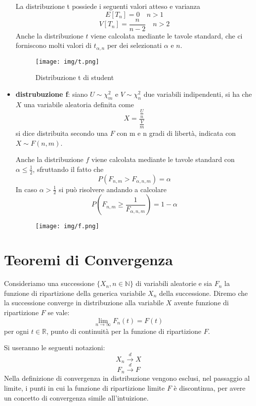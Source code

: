\documentclass[a4paper,12pt, oneside]{book}
\newcommand{\numberset}{\mathbb}
\newcommand{\N}{\numberset{N}}
\newcommand{\R}{\numberset{R}}
\begin{document}
\begin{itemize}
        La distribuzione t possiede i seguenti valori atteso e varianza
        \[ E[T_n] = 0 \quad n > 1 \]
        \[ V[T_n] = \frac{n}{n - 2} \quad n > 2 \]
        Anche la distribuzione $t$ viene calcolata mediante le tavole standard, che ci forniscono molti
        valori di $t_{\alpha, n}$ per dei selezionati $\alpha$ e $n$.
        \begin{figure}
            \caption{Distribuzione t di student}
            \label{img:student}
	        \texttt{[image: img/t.png]}
        \end{figure}

    \item \textbf{distrubuzione f}: siano $U \sim \chi_m^2$ e $V \sim \chi_n^2$ due variabili indipendenti, si
        ha che $X$ una variabile aleatoria definita come 
        \[X = \frac{\frac{U}{n}}{\frac{V}{m}}\]
        si dice distribuita secondo una $F$ con m e n gradi di libertà, indicata con $X \sim F(n, m)$.

        Anche la distribuzione $f$ viene calcolata mediante le tavole standard con $\alpha \leq \frac{1}{2}$,
        sfruttando il fatto che 
        \[ P(F_{n, m} > F_{\alpha, n, m}) = \alpha \]
        In caso $\alpha > \frac{1}{2}$ si può risolvere andando a calcolare
        \[ P(F_{n, m} \geq \frac{1}{F_{\alpha, n, m}}) = 1 - \alpha \]
        \begin{figure}
	        \texttt{[image: img/f.png]}
        \end{figure}
\end{itemize}

\chapter{Teoremi di Convergenza}
Consideriamo una successione $\{X_n, n \in \N\}$ di variabili aleatorie e sia $F_n$ la funzione di ripartizione
della generica variabile $X_n$ della successione.\newline
Diremo che la successione converge in distribuzione alla variabile $X$ avente funzione di ripartizione $F$ se vale:
\[\lim_{n\to\infty} F_n(t) = F(t)\]
per ogni $t \in \R$, punto di continuità per la funzione di ripartizione $F$. 

Si useranno le seguenti notazioni:
\[X_n\stackrel{d}{\longrightarrow} X\]
\[F_n\stackrel{d}{\longrightarrow} F\]
Nella definizione di convergenza in distribuzione vengono esclusi, nel passaggio al limite, i punti 
in cui la funzione di ripartizione limite $F$ è discontinua, per avere un concetto di convergenza simile all'intuizione.
\end{document}
